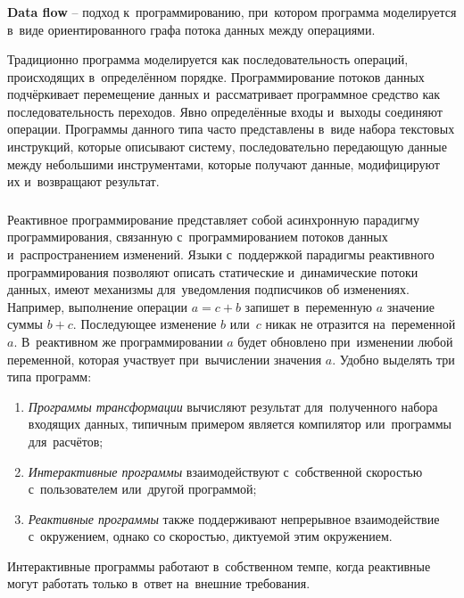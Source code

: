 \subsubsection{}
\label{sec:analysis:research:mobArch:dataflow}

\textbf{Data flow} -- подход к~программированию, при~котором программа моделируется в~виде ориентированного графа потока данных между операциями\cite{wiki:data-flow}.

Традиционно программа моделируется как последовательность операций, происходящих в~определённом порядке. Программирование потоков данных подчёркивает перемещение данных и~рассматривает программное средство как последовательность переходов. Явно определённые входы и~выходы соединяют операции. Программы данного типа часто представлены в~виде набора текстовых инструкций, которые описывают систему, последовательно передающую данные между небольшими инструментами, которые получают данные, модифицируют их и~возвращают результат. 

\subsubsection{}
\label{sec:analysis:research:mobArch:reactive}

Реактивное программирование представляет собой асинхронную парадигму программирования, связанную с~программированием потоков данных и~распространением изменений. Языки с~поддержкой парадигмы реактивного программирования позволяют описать статические и~динамические потоки данных, имеют механизмы для~уведомления подписчиков об изменениях. Например, выполнение операции \(a = c + b\) запишет в~переменную \(a\) значение суммы \(b + c\). Последующее изменение \(b\) или~\(c\) никак не отразится на~переменной \(a\). В~реактивном же программировании \(a\) будет обновлено при~изменении любой переменной, которая участвует при~вычислении значения \(a\).
Удобно выделять три типа программ:
\begin{enumerate}
	\item \emph{Программы трансформации} вычисляют результат для~полученного набора входящих данных, типичным примером является компилятор или~программы для~расчётов;
	\item \emph{Интерактивные программы} взаимодействуют с~собственной скоростью с~пользователем или~другой программой;
	\item \emph{Реактивные программы} также поддерживают непрерывное взаимодействие с~окружением, однако со скоростью, диктуемой этим окружением.
\end{enumerate}
Интерактивные программы работают в~собственном темпе, когда реактивные могут работать только в~ответ на~внешние требования.